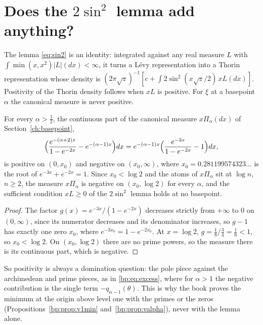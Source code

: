 \section{Does the $2\sin^2$ lemma add anything?}\label{qrh:sec:sin2}

The lemma \eqref{eq:sin2} is an identity: integrated against any real measure $L$ with $\int\min(x,x^2)|L|(dx)<\infty$, it turns a L\'evy representation into a Thorin representation whose density is $(2\pi\sqrt z)^{-1}[c+\int2\sin^2(x\sqrt z/2)\,xL(dx)]$. Positivity of the Thorin density follows when $xL$ is positive. For $\xi$ at a basepoint $\alpha$ the canonical measure is never positive.

\begin{proposition}\label{qrh:prop:signed}
For every $\alpha>\frac12$, the continuous part of the canonical measure $x\Pi_\alpha(dx)$ of Section~\ref{ch:basepoint},
\[
\Bigl(\frac{e^{-(\alpha+2)x}}{1-e^{-2x}}-e^{-(\alpha-1)x}\Bigr)dx=e^{-(\alpha-1)x}\Bigl(\frac{e^{-3x}}{1-e^{-2x}}-1\Bigr)dx,
\]
is positive on $(0,x_0)$ and negative on $(x_0,\infty)$, where $x_0=0.281199574323\ldots$ is the root of $e^{-3x}+e^{-2x}=1$. Since $x_0<\log2$ and the atoms of $x\Pi_\alpha$ sit at $\log n$, $n\ge2$, the measure $x\Pi_\alpha$ is negative on $(x_0,\log2)$ for every $\alpha$, and the sufficient condition $xL\ge0$ of the $2\sin^2$ lemma holds at no basepoint.
\end{proposition}

\begin{proof}
The factor $g(x)=e^{-3x}/(1-e^{-2x})$ decreases strictly from $+\infty$ to $0$ on $(0,\infty)$, since its numerator decreases and its denominator increases, so $g-1$ has exactly one zero $x_0$, where $e^{-3x_0}=1-e^{-2x_0}$. At $x=\log2$, $g=\frac18/\frac34=\frac16<1$, so $x_0<\log2$. On $(x_0,\log2)$ there are no prime powers, so the measure there is its continuous part, which is negative.
\end{proof}

So positivity is always a domination question: the pole piece against the archimedean and prime pieces, as in \eqref{bp:eq:excess}, where for $\alpha>1$ the negative contribution is the single term $-q_{\alpha-1}(\theta)$. This is why the book proves the minimum at the origin above level one with the primes or the zeros (Propositions~\ref{bp:prop:v1min} and~\ref{bp:prop:valpha}), never with the lemma alone.

